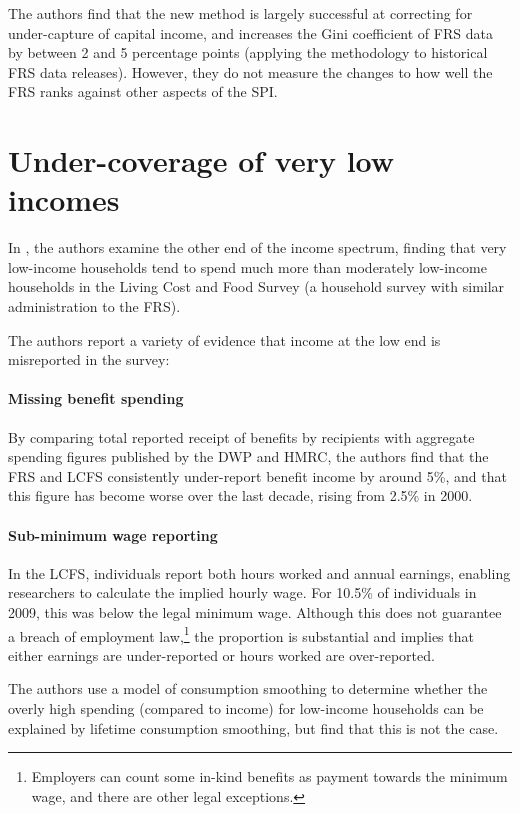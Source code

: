 \documentclass{article}
\begin{document}
The authors find that the new method is largely successful at correcting for under-capture of capital income, and increases the Gini coefficient of FRS data by between 2 and 5 percentage points (applying the methodology to historical FRS data releases). However, they do not measure the changes to how well the FRS ranks against other aspects of the SPI.

\section{Under-coverage of very low incomes}

In \cite{brewer_low_income_coverage}, the authors examine the other end of the income spectrum, finding that very low-income households tend to spend much more than moderately low-income households in the Living Cost and Food Survey (a household survey with similar administration to the FRS).

The authors report a variety of evidence that income at the low end is misreported in the survey:

\paragraph{Missing benefit spending} By comparing total reported receipt of benefits by recipients with aggregate spending figures published by the DWP and HMRC, the authors find that the FRS and LCFS consistently under-report benefit income by around 5\%, and that this figure has become worse over the last decade, rising from 2.5\% in 2000.

\paragraph{Sub-minimum wage reporting} In the LCFS, individuals report both hours worked and annual earnings, enabling researchers to calculate the implied hourly wage. For 10.5\% of individuals in 2009, this was below the legal minimum wage. Although this does not guarantee a breach of employment law,\footnote{Employers can count some in-kind benefits as payment towards the minimum wage, and there are other legal exceptions.} the proportion is substantial and implies that either earnings are under-reported or hours worked are over-reported.

The authors use a model of consumption smoothing to determine whether the overly high spending (compared to income) for low-income households can be explained by lifetime consumption smoothing, but find that this is not the case.
\end{document}

